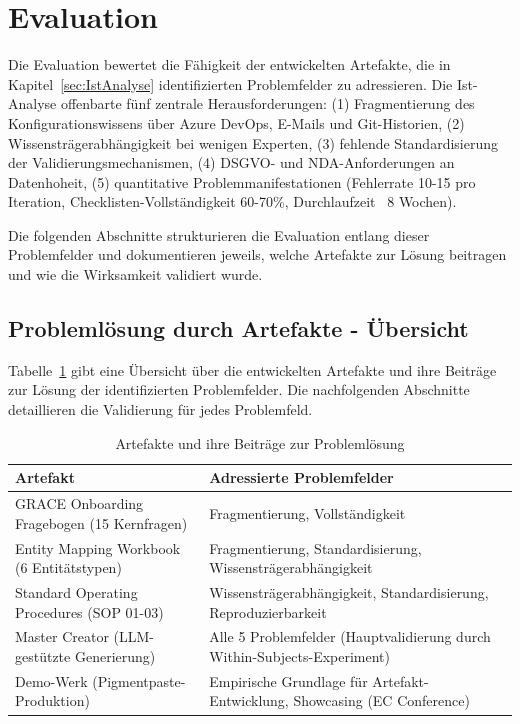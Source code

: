 \section{Evaluation}
\label{sec:Evaluation}

Die Evaluation bewertet die Fähigkeit der entwickelten Artefakte, die in Kapitel~\ref{sec:IstAnalyse} identifizierten Problemfelder zu adressieren. Die Ist-Analyse offenbarte fünf zentrale Herausforderungen: (1) Fragmentierung des Konfigurationswissens über Azure DevOps, E-Mails und Git-Historien, (2) Wissensträgerabhängigkeit bei wenigen Experten, (3) fehlende Standardisierung der Validierungsmechanismen, (4) DSGVO- und NDA-Anforderungen an Datenhoheit, (5) quantitative Problemmanifestationen (Fehlerrate 10-15 pro Iteration, Checklisten-Vollständigkeit 60-70\%, Durchlaufzeit ~8 Wochen).

\noindent Die folgenden Abschnitte strukturieren die Evaluation entlang dieser Problemfelder und dokumentieren jeweils, welche Artefakte zur Lösung beitragen und wie die Wirksamkeit validiert wurde.


\subsection{Problemlösung durch Artefakte - Übersicht}
\label{subsec:ProblemlösungÜbersicht}

Tabelle~\ref{tab:ArtefaktProblembeitrag} gibt eine Übersicht über die entwickelten Artefakte und ihre Beiträge zur Lösung der identifizierten Problemfelder. Die nachfolgenden Abschnitte detaillieren die Validierung für jedes Problemfeld.

\begin{table}[htbp]
\centering
\small
\begin{tabular}{|p{3.5cm}|p{9cm}|}
\hline
\textbf{Artefakt} & \textbf{Adressierte Problemfelder} \\
\hline
GRACE Onboarding Fragebogen (15 Kernfragen) & Fragmentierung, Vollständigkeit \\
\hline
Entity Mapping Workbook (6 Entitätstypen) & Fragmentierung, Standardisierung, Wissensträgerabhängigkeit \\
\hline
Standard Operating Procedures (SOP 01-03) & Wissensträgerabhängigkeit, Standardisierung, Reproduzierbarkeit \\
\hline
Master Creator (LLM-gestützte Generierung) & Alle 5 Problemfelder (Hauptvalidierung durch Within-Subjects-Experiment) \\
\hline
Demo-Werk (Pigmentpaste-Produktion) & Empirische Grundlage für Artefakt-Entwicklung, Showcasing (EC Conference) \\
\hline
\end{tabular}
\caption{Artefakte und ihre Beiträge zur Problemlösung}
\label{tab:ArtefaktProblembeitrag}
\end{table}


